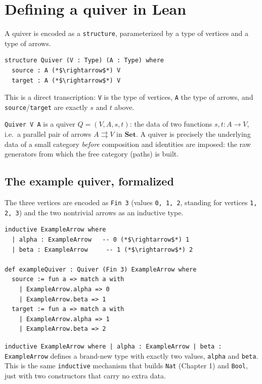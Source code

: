 \section{Defining a quiver in Lean}\label{sec:11-path-algebras:03-defining-a-quiver:1}

A quiver is encoded as a \texttt{structure}, parameterized by a type of vertices and a type of arrows.

\begin{lstlisting}
structure Quiver (V : Type) (A : Type) where
  source : A (*$\rightarrow$*) V
  target : A (*$\rightarrow$*) V
\end{lstlisting}

This is a direct transcription: \texttt{V} is the type of vertices, \texttt{A} the type of arrows, and \texttt{source}/\texttt{target} are exactly \(s\) and \(t\) above.

\begin{mathreading}

\texttt{Quiver V A} is a quiver \(Q = (V, A, s, t)\): the data of two functions \(s, t : A \to V\), i.e.~a parallel pair of arrows \(A \rightrightarrows V\) in \(\mathbf{Set}\). A quiver is precisely the underlying data of a small category \emph{before} composition and identities are imposed: the raw generators from which the free category (paths) is built.

\end{mathreading}

\subsection{The example quiver, formalized}\label{sec:11-path-algebras:03-defining-a-quiver:2}

The three vertices are encoded as \texttt{Fin 3} (values \texttt{0, 1, 2}, standing for vertices \texttt{1, 2, 3}) and the two nontrivial arrows as an inductive type.

\begin{lstlisting}
inductive ExampleArrow where
  | alpha : ExampleArrow   -- 0 (*$\rightarrow$*) 1
  | beta : ExampleArrow     -- 1 (*$\rightarrow$*) 2

def exampleQuiver : Quiver (Fin 3) ExampleArrow where
  source := fun a => match a with
    | ExampleArrow.alpha => 0
    | ExampleArrow.beta => 1
  target := fun a => match a with
    | ExampleArrow.alpha => 1
    | ExampleArrow.beta => 2
\end{lstlisting}

\texttt{inductive ExampleArrow where | alpha : ExampleArrow | beta : ExampleArrow} defines a brand-new type with exactly two values, \texttt{alpha} and \texttt{beta}. This is the same \texttt{inductive} mechanism that builds \texttt{Nat} (Chapter 1) and \texttt{Bool}, just with two constructors that carry no extra data.

